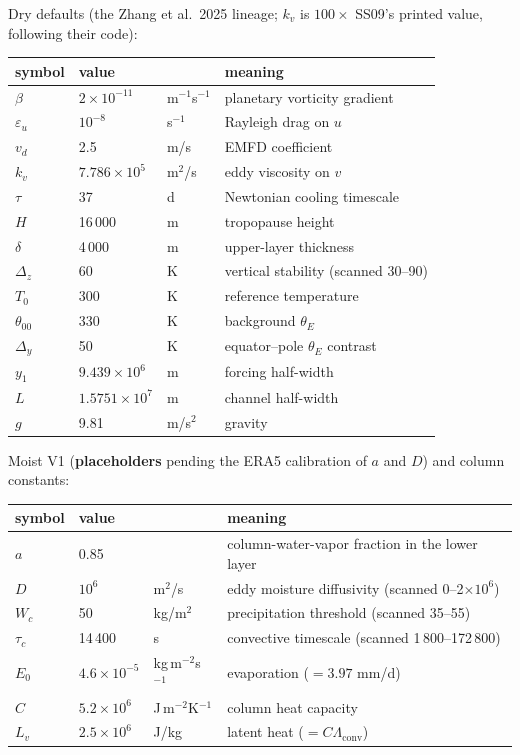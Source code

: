 \documentclass[11pt]{article}
\begin{document}
Dry defaults (the Zhang et al.\ 2025 lineage; $k_v$ is $100\times$ SS09's
printed value, following their code):
\begin{center}
\begin{tabular}{llll}
\toprule
symbol & value & & meaning \\
\midrule
$\beta$ & $2\times10^{-11}$ & m$^{-1}$s$^{-1}$ & planetary vorticity gradient \\
$\varepsilon_u$ & $10^{-8}$ & s$^{-1}$ & Rayleigh drag on $u$ \\
$v_d$ & 2.5 & m/s & EMFD coefficient \\
$k_v$ & $7.786\times10^{5}$ & m$^2$/s & eddy viscosity on $v$ \\
$\tau$ & 37 & d & Newtonian cooling timescale \\
$H$ & 16\,000 & m & tropopause height \\
$\delta$ & 4\,000 & m & upper-layer thickness \\
$\Delta_z$ & 60 & K & vertical stability (scanned 30--90) \\
$T_0$ & 300 & K & reference temperature \\
$\theta_{00}$ & 330 & K & background $\theta_E$ \\
$\Delta_y$ & 50 & K & equator--pole $\theta_E$ contrast \\
$y_1$ & $9.439\times10^{6}$ & m & forcing half-width \\
$L$ & $1.5751\times10^{7}$ & m & channel half-width \\
$g$ & 9.81 & m/s$^2$ & gravity \\
\bottomrule
\end{tabular}
\end{center}

Moist V1 (\textbf{placeholders} pending the ERA5 calibration of $a$ and
$D$) and column constants:
\begin{center}
\begin{tabular}{llll}
\toprule
symbol & value & & meaning \\
\midrule
$a$ & 0.85 & & column-water-vapor fraction in the lower layer \\
$D$ & $10^{6}$ & m$^2$/s & eddy moisture diffusivity (scanned 0--2$\times10^6$) \\
$W_c$ & 50 & kg/m$^2$ & precipitation threshold (scanned 35--55) \\
$\tau_c$ & 14\,400 & s & convective timescale (scanned 1\,800--172\,800) \\
$E_0$ & $4.6\times10^{-5}$ & kg\,m$^{-2}$s$^{-1}$ & evaporation ($=3.97$ mm/d) \\
$C$ & $5.2\times10^{6}$ & J\,m$^{-2}$K$^{-1}$ & column heat capacity \\
$L_v$ & $2.5\times10^{6}$ & J/kg & latent heat ($= C\Lambda_{\mathrm{conv}}$) \\
\bottomrule
\end{tabular}
\end{center}
\end{document}
